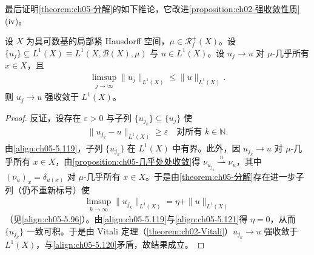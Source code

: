 \documentclass[../../main.tex]{subfiles}
\begin{document}
最后证明\cref{theorem:ch05-分解}的如下推论，它改进\cref{proposition:ch02-强收敛性质}(iv)。

\begin{proposition}\label{proposition:ch05-强收敛}
设 $X$ 为具可数基的局部紧 Hausdorff 空间，$\mu\in\mathscr{R}^+_f(X)$。设 $\{u_j\}\subseteq L^1(X)\equiv L^1(X,\mathscr{B}(X),\mu)$ 与 $u\in L^1(X)$。设 $u_j\to u$ 对 $\mu$-几乎所有 $x\in X$，且
\begin{align}
\limsup_{j\to\infty}\|u_j\|_{L^1(X)}\leqslant\|u\|_{L^1(X)}.\label{align:ch05-5.119}
\end{align}
则 $u_j\to u$ 强收敛于 $L^1(X)$。
\end{proposition}

\begin{proof}
反证，设存在 $\varepsilon>0$ 与子列 $\{u_{j_k}\}\subseteq\{u_j\}$ 使
\begin{align}
\|u_{j_k}-u\|_{L^1(X)}\geqslant\varepsilon\quad\text{对所有 }k\in\mathbb{N}.\label{align:ch05-5.120}
\end{align}
由\eqref{align:ch05-5.119}，子列 $\{u_{j_k}\}$ 在 $L^1(X)$ 中有界。此外，因 $u_{j_k}\to u$ 对 $\mu$-几乎所有 $x\in X$，由\cref{proposition:ch05-几乎处处收敛}得 $\nu_{u_{j_k}}\stackrel{n}{\rightharpoonup}\nu_u$，其中 $(\nu_u)_x=\delta_{u(x)}$ 对 $\mu$-几乎所有 $x\in X$。于是由\cref{theorem:ch05-分解}存在进一步子列（仍不重新标号）使
\begin{align}
\limsup_{k\to\infty}\|u_{j_k}\|_{L^1(X)}=\eta+\|u\|_{L^1(X)}\label{align:ch05-5.121}
\end{align}
（见\eqref{align:ch05-5.96}）。由\eqref{align:ch05-5.119}与\eqref{align:ch05-5.121}得 $\eta=0$，从而 $\{u_{j_k}\}$ 一致可积。于是由 Vitali 定理（\cref{theorem:ch02-Vitali}）$u_{j_k}\to u$ 强收敛于 $L^1(X)$，与\eqref{align:ch05-5.120}矛盾，故结果成立。
\end{proof}
\end{document}
